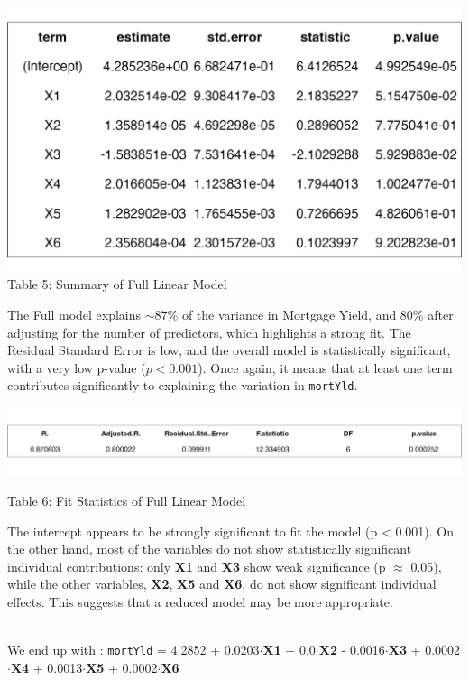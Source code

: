 \documentclass[
  11pt,
]{article}
\begin{document}
\begin{minipage}{0.42\textwidth}
\includegraphics[width=1.2\linewidth]{full_model_summary_table.png}
\vspace{-0.2em}
\small Table 5: Summary of Full Linear Model
\end{minipage}
\hfill
\begin{minipage}{0.45\textwidth}
\small
The Full model explains $\sim$87\% of the variance in Mortgage Yield, and 80\% after adjusting for the number of predictors, which highlights a strong fit. The Residual Standard Error is low, and the overall model is statistically significant, with a very low p-value ($p < 0.001$). Once again, it means that at least one term contributes significantly to explaining the variation in \texttt{mortYld}.
\end{minipage}

\noindent
\includegraphics[width=0.9\linewidth,height=0.18\textheight]{full_model_fitstats_table.png}

\par

\small Table 6: Fit Statistics of Full Linear Model

\addtocounter{table}{2}

The intercept appears to be strongly significant to fit the model (p
\textless{} 0.001). On the other hand, most of the variables do not show
statistically significant individual contributions: only \textbf{X1} and
\textbf{X3} show weak significance (p \(\approx\) 0.05), while the other
variables, \textbf{X2}, \textbf{X5} and \textbf{X6}, do not show
significant individual effects. This suggests that a reduced model may
be more appropriate.\\
\strut \\
We end up with : \texttt{mortYld} = 4.2852 + 0.0203\(\cdot\)\textbf{X1}
+ 0.0\(\cdot\)\textbf{X2} - 0.0016\(\cdot\)\textbf{X3} +
0.0002\(\cdot\)\textbf{X4} + 0.0013\(\cdot\)\textbf{X5} +
0.0002\(\cdot\)\textbf{X6}
\end{document}
